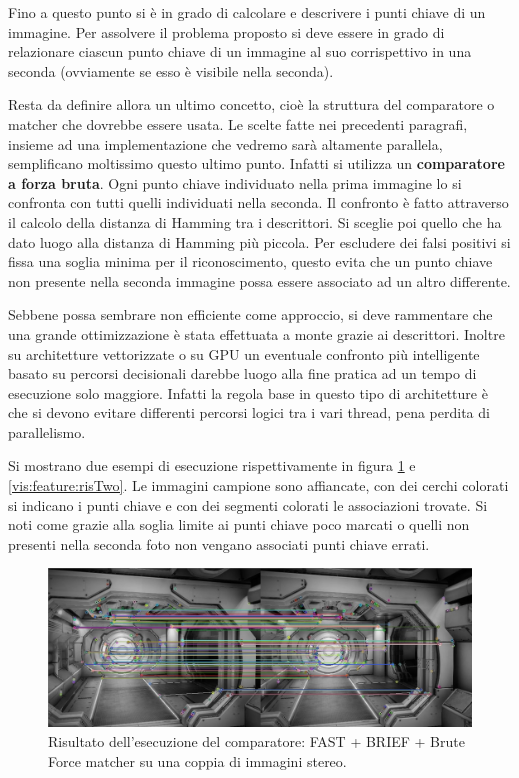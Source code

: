 Fino a questo punto si è in grado di calcolare e descrivere i punti chiave di un immagine. Per assolvere il problema proposto si deve essere in grado di relazionare ciascun punto chiave di un immagine al suo corrispettivo in una seconda (ovviamente se esso è visibile nella seconda). 

Resta da definire allora un ultimo concetto, cioè la struttura del comparatore o matcher che dovrebbe essere usata. Le scelte fatte nei precedenti paragrafi, insieme ad una implementazione che vedremo sarà altamente parallela, semplificano moltissimo questo ultimo punto. Infatti si utilizza un \textbf{comparatore a forza bruta}. Ogni punto chiave individuato nella prima immagine lo si confronta con tutti quelli individuati nella seconda. Il confronto è fatto attraverso il calcolo della distanza di Hamming tra i descrittori. Si sceglie poi quello che ha dato luogo alla distanza di Hamming più piccola. Per escludere dei falsi positivi si fissa una soglia minima per il riconoscimento, questo evita che un punto chiave non presente nella seconda immagine possa essere associato ad un altro differente.

Sebbene possa sembrare non efficiente come approccio, si deve rammentare che una grande ottimizzazione è stata effettuata a monte grazie ai descrittori. Inoltre su architetture vettorizzate o su GPU un eventuale confronto più intelligente basato su percorsi decisionali darebbe luogo alla fine pratica ad un tempo di esecuzione solo maggiore. Infatti la regola base in questo tipo di architetture è che si devono evitare differenti percorsi logici tra i vari thread, pena perdita di parallelismo.

Si mostrano due esempi di esecuzione rispettivamente in figura \ref{vis:feature:risStereo} e \ref{vis:feature:risTwo}. Le immagini campione sono affiancate, con dei cerchi colorati si indicano i punti chiave e con dei segmenti colorati le associazioni trovate. Si noti come grazie alla soglia limite ai punti chiave poco marcati o quelli non presenti nella seconda foto non vengano associati punti chiave errati.
\begin{figure}[h!]
	\centering
	\includegraphics[width=420pt]{imgs/stereoDetection.jpg}
	\caption{Risultato dell'esecuzione del comparatore: FAST + BRIEF + Brute Force matcher su una coppia di immagini stereo.}
	\label{vis:feature:risStereo}
\end{figure} 

